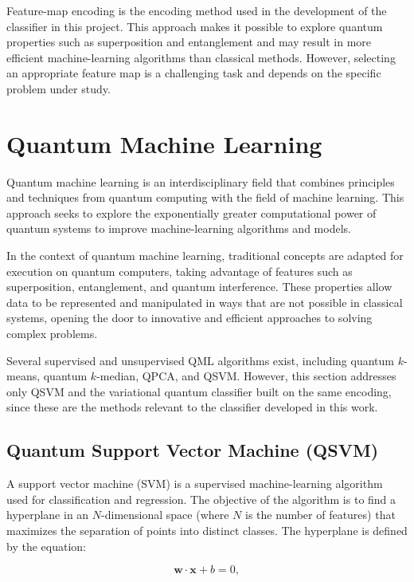 Feature-map encoding is the encoding method used in the development of the classifier in this project. This approach makes it possible to explore quantum properties such as superposition and entanglement and may result in more efficient machine-learning algorithms than classical methods. However, selecting an appropriate feature map is a challenging task and depends on the specific problem under study.

\section{Quantum Machine Learning}

Quantum machine learning is an interdisciplinary field that combines principles and techniques from quantum computing with the field of machine learning. This approach seeks to explore the exponentially greater computational power of quantum systems to improve machine-learning algorithms and models.

In the context of quantum machine learning, traditional concepts are adapted for execution on quantum computers, taking advantage of features such as superposition, entanglement, and quantum interference. These properties allow data to be represented and manipulated in ways that are not possible in classical systems, opening the door to innovative and efficient approaches to solving complex problems.

Several supervised and unsupervised QML algorithms exist, including quantum $k$-means, quantum $k$-median, QPCA, and QSVM. However, this section addresses only QSVM and the variational quantum classifier built on the same encoding, since these are the methods relevant to the classifier developed in this work.

\subsection{Quantum Support Vector Machine (QSVM)} \label{QSVM}

A support vector machine (SVM) is a supervised machine-learning algorithm used for classification and regression. The objective of the algorithm is to find a hyperplane in an $N$-dimensional space (where $N$ is the number of features) that maximizes the separation of points into distinct classes. The hyperplane is defined by the equation:

\begin{equation}
\mathbf{w} \cdot \mathbf{x} + b = 0,
\end{equation}

